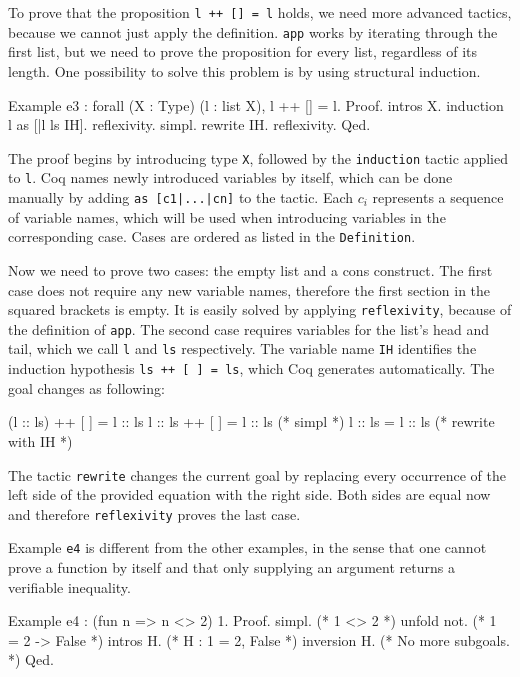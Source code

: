 \documentclass[paper = a4, fleqn, abstract=on, twoside]{scrreprt}
\newcommand{\coqinline}[1]{\texttt{#1}}
\begin{document}
\par
To prove that the proposition \coqinline{l ++ [] = l} holds, we need more advanced tactics, because we cannot just apply the definition. \coqinline{app} works by iterating through the first list, but we need to prove the proposition for every list, regardless of its length. One possibility to solve this problem is by using structural induction.
\begin{coqcode}
Example e3 : forall (X : Type) (l : list X), l ++ [] = l.
Proof. intros X. induction l as [|l ls IH].
  reflexivity.
  simpl. rewrite IH. reflexivity.
Qed.
\end{coqcode}
The proof begins by introducing type \coqinline{X}, followed by the \coqinline{induction} tactic applied to \coqinline{l}. Coq names newly introduced variables by itself, which can be done manually by adding \coqinline{as [c1|...|cn]} to the tactic. Each $c_{i}$ represents a sequence of variable names, which will be used when introducing variables in the corresponding case. Cases are ordered as listed in the \coqinline{Definition}.
\par
Now we need to prove two cases: the empty list and a cons construct. The first case does not require any new variable names, therefore the first section in the squared brackets is empty. It is easily solved by applying \coqinline{reflexivity}, because of the definition of \coqinline{app}.
The second case requires variables for the list's head and tail, which we call \coqinline{l} and \coqinline{ls} respectively. The variable name \coqinline{IH} identifies the induction hypothesis \coqinline{ls ++ [ ] = ls}, which Coq generates automatically. The goal changes as following:
\begin{coqcode}
(l :: ls) ++ [ ] = l :: ls
 l :: ls  ++ [ ] = l :: ls (* simpl *)
 l :: ls         = l :: ls (* rewrite with IH *)
\end{coqcode}
The tactic \coqinline{rewrite} changes the current goal by replacing every occurrence of the left side of the provided equation with the right side. Both sides are equal now and therefore \coqinline{reflexivity} proves the last case.
\par 
Example \coqinline{e4} is different from the other examples, in the sense that one cannot prove a function by itself and that only supplying an argument returns a verifiable inequality. 
\begin{coqcode}
Example e4 : (fun n => n <> 2) 1.
Proof.
  simpl.       (* 1 <> 2 *)
  unfold not.  (* 1 = 2 -> False *)
  intros H.    (* H : 1 = 2, False *)
  inversion H. (* No more subgoals. *)
Qed.
\end{coqcode}
\end{document}
